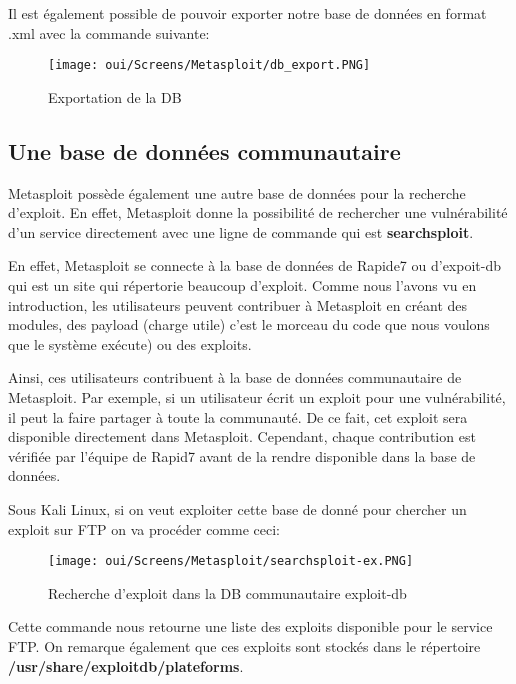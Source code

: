 Il est également possible de pouvoir exporter notre base de données en format .xml avec la commande suivante:
\begin{figure}[htp!]
  \centering
  \setlength\figureheight{7cm}
  \setlength\figurewidth{9cm}
  \texttt{[image: oui/Screens/Metasploit/db\_export.PNG]}
  \caption{Exportation de la DB}
  \label{fig:courbe-tikz}
\end{figure}

\subsection{Une base de données communautaire}
Metasploit possède également une autre base de données pour la recherche d'exploit. En effet, Metasploit donne la possibilité de rechercher une vulnérabilité d'un service directement avec une ligne de commande qui est \textbf{searchsploit}.

En effet, Metasploit se connecte à la base de données de Rapide7 ou d'expoit-db qui est un site qui répertorie beaucoup d'exploit. Comme nous l'avons vu en introduction, les utilisateurs peuvent contribuer à Metasploit en créant des modules, des payload (charge utile) c'est le morceau du code que nous voulons que le système exécute) ou des exploits. 

Ainsi, ces utilisateurs contribuent à la base de données communautaire de Metasploit. Par exemple, si un utilisateur écrit un exploit pour une vulnérabilité, il peut la faire partager à toute la communauté. De ce fait, cet exploit sera disponible directement dans Metasploit. Cependant, chaque contribution est vérifiée par l'équipe de Rapid7 avant de la rendre disponible dans la base de données.

Sous Kali Linux, si on veut exploiter cette base de donné pour chercher un exploit sur FTP on va procéder comme ceci:

\begin{figure}[htp!]
  \centering
  \setlength\figureheight{7cm}
  \setlength\figurewidth{9cm}
  \texttt{[image: oui/Screens/Metasploit/searchsploit-ex.PNG]}
  \caption{Recherche d'exploit dans la DB communautaire exploit-db}
  \label{fig:courbe-tikz}
\end{figure}

\noindent Cette commande nous retourne une liste des exploits disponible pour le service FTP. On remarque également que ces exploits sont stockés dans le répertoire \textbf{/usr/share/exploitdb/plateforms}.

